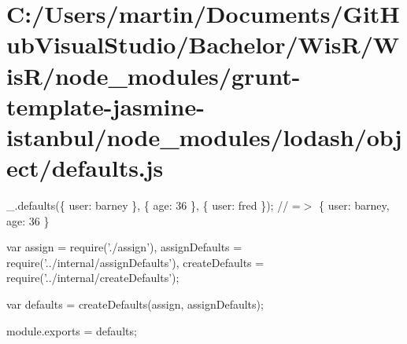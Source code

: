 \hypertarget{_c_1_2_users_2martin_2_documents_2_git_hub_visual_studio_2_bachelor_2_wis_r_2_wis_r_2node_modulee17b77f24eb8135be0e1c4702780150b}{}\section{C\+:/\+Users/martin/\+Documents/\+Git\+Hub\+Visual\+Studio/\+Bachelor/\+Wis\+R/\+Wis\+R/node\+\_\+modules/grunt-\/template-\/jasmine-\/istanbul/node\+\_\+modules/lodash/object/defaults.\+js}
\+\_\+.\+defaults(\{ \textquotesingle{}user\textquotesingle{}\+: \textquotesingle{}barney\textquotesingle{} \}, \{ \textquotesingle{}age\textquotesingle{}\+: 36 \}, \{ \textquotesingle{}user\textquotesingle{}\+: \textquotesingle{}fred\textquotesingle{} \}); // =$>$ \{ \textquotesingle{}user\textquotesingle{}\+: \textquotesingle{}barney\textquotesingle{}, \textquotesingle{}age\textquotesingle{}\+: 36 \}


\begin{DoxyCodeInclude}
var assign = require(\textcolor{stringliteral}{'./assign'}),
    assignDefaults = require(\textcolor{stringliteral}{'../internal/assignDefaults'}),
    createDefaults = require(\textcolor{stringliteral}{'../internal/createDefaults'});

var defaults = createDefaults(assign, assignDefaults);

module.exports = defaults;
\end{DoxyCodeInclude}
 